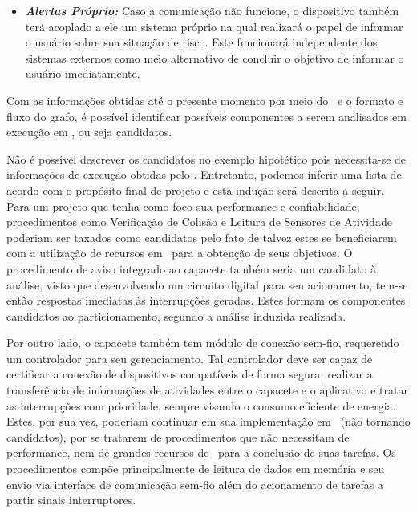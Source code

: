 \begin{description}
\begin{itemize}
                  \item \textbf{\textit{Alertas Próprio:}} 
                     Caso a comunicação não funcione, o dispositivo também terá acoplado a ele um sistema próprio na qual realizará o papel de informar o usuário sobre sua situação de risco. 
                     Este funcionará independente dos sistemas externos como meio alternativo de concluir o objetivo de informar o usuário imediatamente.
                     
               \end{itemize}
         \end{description}
         
         Com as informações obtidas até o presente momento por meio do \profile\ e o formato e fluxo do grafo, é possível identificar possíveis componentes a serem analisados em execução em \hardware, ou seja candidatos.
         
         Não é possível descrever os candidatos no exemplo hipotético pois necessita-se de informações de execução obtidas pelo \profile.
         Entretanto, podemos inferir uma lista de acordo com o propósito final de projeto e esta indução será descrita a seguir.
         Para um projeto que tenha como foco sua performance e confiabilidade, procedimentos como Verificação de Colisão e Leitura de Sensores de Atividade poderiam ser taxados como candidatos pelo fato de talvez estes se beneficiarem com a utilização de recursos em \hardware\ para a obtenção de seus objetivos.
         O procedimento de aviso integrado ao capacete também seria um candidato à análise, visto que desenvolvendo um circuito digital para seu acionamento, tem-se então respostas imediatas às interrupções geradas.
         Estes formam os componentes candidatos ao particionamento, segundo a análise induzida realizada.
         
         Por outro lado, o capacete também tem módulo de conexão sem-fio, requerendo um controlador para seu gerenciamento.
         Tal controlador deve ser capaz de certificar a conexão de dispositivos compatíveis de forma segura, realizar a transferência de informações de atividades entre o capacete e o aplicativo e tratar as interrupções com prioridade, sempre visando o consumo eficiente de energia.
         Estes, por sua vez, poderiam continuar em sua implementação em \software\ (não tornando candidatos), por se tratarem de procedimentos que não necessitam de performance, nem de grandes recursos de \hardware\ para a conclusão de suas tarefas.
         Os procedimentos compõe principalmente de leitura de dados em memória e seu envio via interface de comunicação sem-fio além do acionamento de tarefas a partir sinais interruptores.
         
